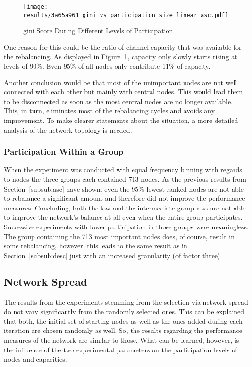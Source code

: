 \documentclass[final]{fhnwreport}       %
\begin{document}
\begin{figure}[htp]
\centering
\texttt{[image: results/3a65a961\_gini\_vs\_participation\_size\_linear\_asc.pdf]}
\caption{\gls{gini} Score During Different Levels of Participation}
\label{fig:gini_part_size_linear_asc}
\end{figure}

One reason for this could be the ratio of channel capacity that was available for the rebalancing. As displayed in Figure~\ref{fig:gini_part_size_linear_asc}, capacity only slowly starts rising at levels of 90\%. Even 95\% of all nodes only contribute 11\% of capacity. 

Another conclusion would be that most of the unimportant nodes are not well connected with each other but mainly with central nodes. This would lead them to be disconnected as soon as the most central nodes are no longer available. This, in turn, eliminates most of the rebalancing cycles and avoids any improvement. To make clearer statements about the situation, a more detailed analysis of the network topology is needed.

\subsubsection{Participation Within a Group}
When the experiment was conducted with equal frequency binning with regards to nodes the three groups each contained 713 nodes. As the previous results from Section~\ref{subsub:asc} have shown, even the 95\% lowest-ranked nodes are not able to rebalance a significant amount and therefore did not improve the performance measures. Concluding, both the low and the intermediate group also are not able to improve the network's balance at all even when the entire group participates. Successive experiments with lower participation in those groups were meaningless. The group containing the 713 most important nodes does, of course, result in some rebalancing, however, this leads to the same result as in Section~\ref{subsub:desc} just with an increased granularity (of factor three).

\subsection{Network Spread}
The results from the experiments stemming from the selection via network spread do not vary significantly from the randomly selected ones. This can be explained that both, the initial set of starting nodes as well as the ones added during each iteration are chosen randomly as well. So, the results regarding the performance measures of the network are similar to those. What can be learned, however, is the influence of the two experimental parameters on the participation levels of nodes and capacities.
\end{document}
